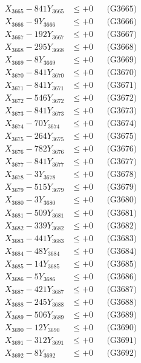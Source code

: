 \documentclass[a4paper,10pt]{article}
\begin{document}
{\begin{align}
X_{3665} - 841Y_{3665} &\leq +0 && \text{(G3665)} \\
X_{3666} - 9Y_{3666} &\leq +0 && \text{(G3666)} \\
X_{3667} - 192Y_{3667} &\leq +0 && \text{(G3667)} \\
X_{3668} - 295Y_{3668} &\leq +0 && \text{(G3668)} \\
X_{3669} - 8Y_{3669} &\leq +0 && \text{(G3669)} \\
X_{3670} - 841Y_{3670} &\leq +0 && \text{(G3670)} \\
\allowbreak
X_{3671} - 841Y_{3671} &\leq +0 && \text{(G3671)} \\
X_{3672} - 546Y_{3672} &\leq +0 && \text{(G3672)} \\
X_{3673} - 841Y_{3673} &\leq +0 && \text{(G3673)} \\
X_{3674} - 70Y_{3674} &\leq +0 && \text{(G3674)} \\
X_{3675} - 264Y_{3675} &\leq +0 && \text{(G3675)} \\
X_{3676} - 782Y_{3676} &\leq +0 && \text{(G3676)} \\
X_{3677} - 841Y_{3677} &\leq +0 && \text{(G3677)} \\
X_{3678} - 3Y_{3678} &\leq +0 && \text{(G3678)} \\
X_{3679} - 515Y_{3679} &\leq +0 && \text{(G3679)} \\
X_{3680} - 3Y_{3680} &\leq +0 && \text{(G3680)} \\
\allowbreak
X_{3681} - 509Y_{3681} &\leq +0 && \text{(G3681)} \\
X_{3682} - 339Y_{3682} &\leq +0 && \text{(G3682)} \\
X_{3683} - 441Y_{3683} &\leq +0 && \text{(G3683)} \\
X_{3684} - 48Y_{3684} &\leq +0 && \text{(G3684)} \\
X_{3685} - 14Y_{3685} &\leq +0 && \text{(G3685)} \\
X_{3686} - 5Y_{3686} &\leq +0 && \text{(G3686)} \\
X_{3687} - 421Y_{3687} &\leq +0 && \text{(G3687)} \\
X_{3688} - 245Y_{3688} &\leq +0 && \text{(G3688)} \\
X_{3689} - 506Y_{3689} &\leq +0 && \text{(G3689)} \\
X_{3690} - 12Y_{3690} &\leq +0 && \text{(G3690)} \\
\allowbreak
X_{3691} - 312Y_{3691} &\leq +0 && \text{(G3691)} \\
X_{3692} - 8Y_{3692} &\leq +0 && \text{(G3692)} \\

\end{align}}
\end{document}
